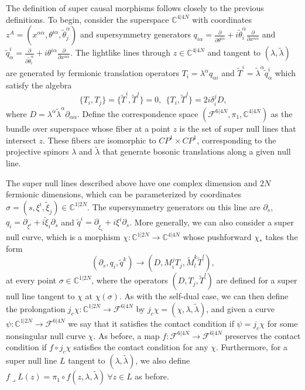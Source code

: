 \documentclass[12pt]{article}
\newcommand{\mbb}{\mathbb}
\newcommand{\prolc}[1]{j_c#1}
\newcommand{\spoint}{z}
\begin{document}
The definition of super causal morphisms follows closely to the previous definitions. To begin, consider the superspace $\mbb{C}^{4\vert 4N}$ with coordinates $\spoint^A=(x^{\alpha\dot{\alpha}},\theta^{i\alpha},\tilde{\theta}_j^{ \dot{\alpha}})$ and supersymmetry generators $q_{i\alpha}=\frac{\partial}{\partial \theta^{i\alpha}}+i\tilde{\theta}^{\dot{\alpha}}_i\frac{\partial}{\partial x^{\alpha\dot{\alpha}}}$ and $\tilde{q}_{\dot{\alpha}}^i=\frac{\partial}{\partial \tilde{\theta}^{\dot{\alpha}}_i}+i\theta^{i\alpha}\frac{\partial}{\partial x^{\alpha\dot{\alpha}}}$.   The lightlike lines through $\spoint\in\mbb{C}^{4\vert 4N}$ and tangent to $(\lambda,\tilde{\lambda})$ are generated by fermionic translation operators $T_i=\lambda^\alpha q_{\alpha i}$ and $\tilde{T}^i=\tilde{\lambda}^{\dot{\alpha}}\tilde{q}_{\dot{\alpha}}^{i}$ which satisfy the algebra 
\begin{equation}\label{eq:symintegrability}
\{T_{i},T_{j}\}=\{\tilde{T}^{i},\tilde{T}^{j}\}=0, \ \ \{T_{i},\tilde{T}^{j}\}=2i\delta_i^j D,
\end{equation}
where $D=\lambda^\alpha\tilde{\lambda}^{\dot{\alpha}}\partial_{\alpha\dot{\alpha}}$.  Define the correspondence space $(\mathcal{F}^{6\vert 4N},\pi_1,\mbb{C}^{4\vert 4N})$ as the bundle over superspace whose fiber at a point $\spoint$ is the set of super null lines that intersect $\spoint$.  These fibers are isomorphic to $CP^1\times CP^1$, corresponding to the projective spinors $\lambda$ and $\tilde{\lambda}$ that generate bosonic translations along a given null line.  

The super null lines described above have one complex dimension and $2N$ fermionic dimensions, which can be parameterized by coordinates $\sigma=(s,\xi^i, \tilde{\xi}_j)\in \mbb{C}^{1\vert 2N}$.  
The supersymmetry generators on this line are $\partial_s$, $q_i=\partial_{\xi^i}+i\tilde{\xi}_i\partial_s$ and $\tilde{q}^i=\partial_{\tilde{\xi}_i}+i\xi^i\partial_s$.  More generally, we can also consider a super null curve, which is a morphism $\chi:\mbb{C}^{1\vert 2N} \rightarrow \mbb{C}^{4\vert 4N}$ whose pushforward $\chi_*$ takes the form \begin{equation}\label{eq:spush}
(\partial_s,q_i,
\tilde{q}^k)\rightarrow (D, M_i^{j}T_{j},\tilde{M}^k_{l}\tilde{T}^l),
\end{equation}
at every point $\sigma\in \mbb{C}^{1\vert 2N}$,
where the operators $(D, T_j, \tilde{T}^l)$ are defined for a super null line tangent to $\chi$ at $\chi(\sigma)$.  As with the self-dual case, we can then define the prolongation $\prolc{\chi}:\mbb{C}^{1\vert 2N}\rightarrow \mathcal{F}^{6\vert 4N}$ by $\prolc{\chi}=(\chi,\lambda, \tilde{\lambda})$,  and given a curve $\psi:\mbb{C}^{1\vert 2N}\rightarrow \mathcal{F}^{6\vert 4N}$ we say that it satisfies the contact condition if $\psi=\prolc{\chi}$ for some nonsingular null curve $\chi$.  As before, a map $f:\mathcal{F}^{6\vert 4N}\rightarrow \mathcal{F}^{6\vert 4N}$ preserves the contact condition if $f\circ \prolc{\chi}$ satisfies the contact condition for any $\chi$.  Furthermore, for a super null line $L$ tangent to $(\lambda,\tilde{\lambda})$, we also define $f\lrcorner L(\spoint)= \pi_1\circ f(\spoint,\lambda,\tilde{\lambda}) \  \forall \spoint\in L$ as before.
 
\end{document}
